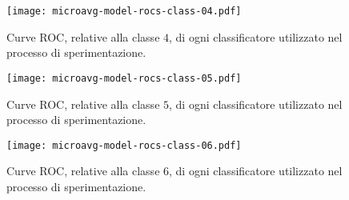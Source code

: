 \begin{figure}
	\centering
	\texttt{[image: microavg-model-rocs-class-04.pdf]}
	\caption[Curve \acs{ROC} relative alla classe $4$]{Curve \acs{ROC}, relative alla classe $4$, di ogni classificatore utilizzato nel processo di sperimentazione.}
	\label{fig:roc-curves-class-4}
\end{figure}

\begin{figure}
	\centering
	\texttt{[image: microavg-model-rocs-class-05.pdf]}
	\caption[Curve \acs{ROC} relative alla classe $5$]{Curve \acs{ROC}, relative alla classe $5$, di ogni classificatore utilizzato nel processo di sperimentazione.}
	\label{fig:roc-curves-class-5}
\end{figure}

\begin{figure}
	\centering
	\texttt{[image: microavg-model-rocs-class-06.pdf]}
	\caption[Curve \acs{ROC} relative alla classe $6$]{Curve \acs{ROC}, relative alla classe $6$, di ogni classificatore utilizzato nel processo di sperimentazione.}
	\label{fig:roc-curves-class-6}
\end{figure}
